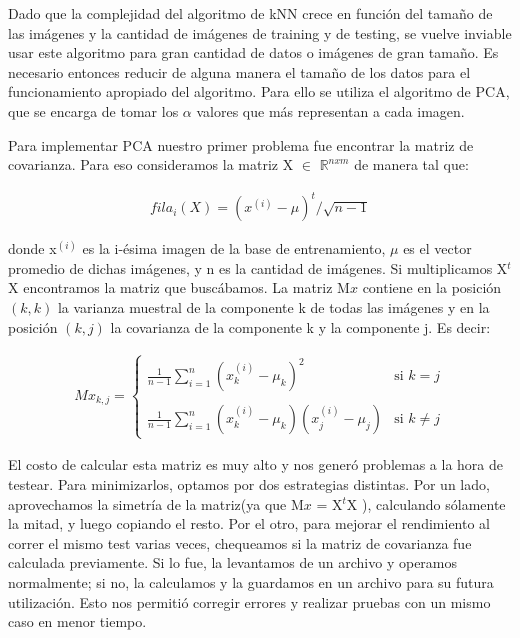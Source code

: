 \documentclass{article}
\begin{document}
Dado que la complejidad del algoritmo de kNN crece en función del tamaño de las imágenes y la cantidad de imágenes de training y de testing, se vuelve inviable usar este algoritmo para gran cantidad de datos o imágenes de gran tamaño. Es necesario entonces reducir de alguna manera el tamaño de los datos para el funcionamiento apropiado del algoritmo. Para ello se utiliza el algoritmo de PCA, que se encarga de tomar los $\alpha$ valores que más representan a cada imagen.

Para implementar PCA nuestro primer problema fue encontrar la matriz de covarianza. Para eso consideramos la matriz X $\in$ $\mathbb{R}^{nxm}$  de manera tal que:

\begin{align*}
fila_i(X)=(x^{(i)} - \mu)^t/\sqrt{n -1}
\end{align*}

donde x$^{(i)}$ es la i-ésima imagen de la base de entrenamiento, $\mu$ es el vector promedio de dichas imágenes, y n es la cantidad de imágenes.
Si multiplicamos X$^t$X encontramos la matriz que buscábamos. La matriz M$x$ contiene en la posición $(k,k)$ la varianza muestral de la componente k de todas las imágenes y en la posición $(k, j)$ la covarianza de la componente k y la componente j. Es decir:

\begin{align*} 
Mx_{k,j} =
\left\{
	\begin{array}{ll}
		\frac{1}{n-1}\sum_{i=1}^{n} (x^{(i)}_k - \mu_k)^2 & \mbox{si } k = j\\
		& \\
		\frac{1}{n-1}\sum_{i=1}^{n} (x^{(i)}_k - \mu_k)(x^{(i)}_j - \mu_j) & \mbox{si } k \neq j
	\end{array}
\right.
\end{align*}



El costo de calcular esta matriz es muy alto y nos generó problemas a la hora de testear. Para minimizarlos, optamos por dos estrategias distintas. Por un lado, aprovechamos la simetría de la matriz(ya que M$x$ = X$^t$X ), calculando sólamente la mitad, y luego copiando el resto. Por el otro, para mejorar el rendimiento al correr el mismo test varias veces, chequeamos si la matriz de covarianza fue calculada previamente. Si lo fue, la levantamos de un archivo y operamos normalmente; si no, la calculamos y la guardamos en un archivo para su futura utilización. Esto nos permitió corregir errores y realizar pruebas con un mismo caso en menor tiempo.
\end{document}
